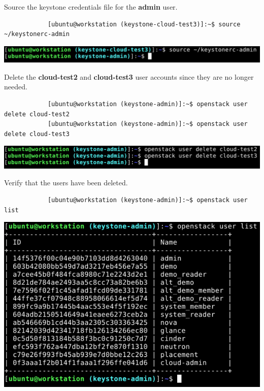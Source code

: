 \documentclass[letterpaper, 12pt]{article}
\begin{document}
\begin{enumerate}
    \begin{labstep}
        Source the keystone credentials file for the \textbf{admin} user.
        \begin{lstlisting}
            [ubuntu@workstation (keystone-cloud-test3)]:~$ source ~/keystonerc-admin
        \end{lstlisting}

        \begin{center}
            \includegraphics[width=\linewidth]{images/part4/step22.png}
        \end{center}
    \end{labstep}

    \begin{labstep}
        Delete the \textbf{cloud-test2} and \textbf{cloud-test3} user accounts since they are no longer needed.
        \begin{lstlisting}
            [ubuntu@workstation (keystone-admin)]:~$ openstack user delete cloud-test2
            [ubuntu@workstation (keystone-admin)]:~$ openstack user delete cloud-test3
        \end{lstlisting}

        \begin{center}
            \includegraphics[width=\linewidth]{images/part4/step23.png}
        \end{center}
    \end{labstep}

    \begin{labstep}
        Verify that the users have been deleted.
        \begin{lstlisting}
            [ubuntu@workstation (keystone-admin)]:~$ openstack user list
        \end{lstlisting}

        \begin{center}
            \includegraphics[width=\linewidth]{images/part4/step24.png}
        \end{center}
    \end{labstep}


\end{enumerate}
\end{document}
